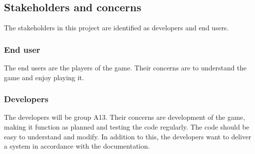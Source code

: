 \subsection{Stakeholders and concerns}

The stakeholders in this project are identified as developers and end users.

\subsubsection{End user}

The end users are the players of the game. Their concerns are to understand the game and enjoy playing it.

\subsubsection{Developers}

The developers will be group A13. Their concerns are development of the game, making it function as planned and testing the code regularly. The code should be easy to understand and modify. In addition to this, the developers want to deliver a system in accordance with the documentation.  


